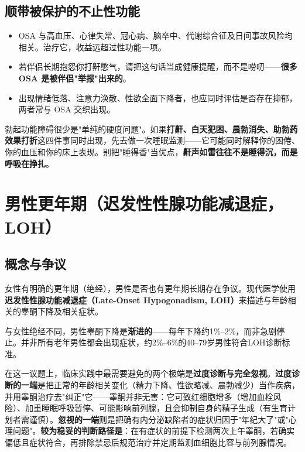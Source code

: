 \subsection{顺带被保护的不止性功能}

\begin{itemize}
	\item OSA 与高血压、心律失常、冠心病、脑卒中、代谢综合征及日间事故风险均相关。治疗它，收益远超过性功能一项。
	\item 若伴侣长期抱怨你打鼾憋气，请把这句话当成健康提醒，而不是唠叨——\textbf{很多 OSA 是被伴侣"举报"出来的}。
	\item 出现情绪低落、注意力涣散、性欲全面下降者，也应同时评估是否存在抑郁，两者常与 OSA 交织出现。
\end{itemize}

\begin{tcolorbox}[colback=pink!5!white,colframe=red!50!black,title=贴心小叮咛]
勃起功能障碍很少是"单纯的硬度问题"。如果\textbf{打鼾、白天犯困、晨勃消失、助勃药效果打折}这四件事同时出现，先去做一次睡眠监测——它可能同时解释你的困倦、你的血压和你的床上表现。别把"睡得香"当优点，\textbf{鼾声如雷往往不是睡得沉，而是呼吸在挣扎}。
\end{tcolorbox}

\section{男性更年期（迟发性性腺功能减退症，LOH）}
\label{sec:male_menopause}

\subsection{概念与争议}

女性有明确的更年期（绝经），男性是否也有更年期长期存在争议。现代医学使用\textbf{迟发性性腺功能减退症（Late-Onset Hypogonadism, LOH）}来描述与年龄相关的睾酮下降及相关症状。

与女性绝经不同，男性睾酮下降是\textbf{渐进的}——每年下降约1\%--2\%，而非急剧停止。并非所有老年男性都会出现症状，约2\%--6\%的40--79岁男性符合LOH诊断标准。


在这一议题上，临床实践中最需要避免的两个极端是\textbf{过度诊断与完全忽视}。\textbf{过度诊断的一端}是把正常的年龄相关变化（精力下降、性欲略减、晨勃减少）当作疾病，并用睾酮治疗去"纠正"它——睾酮并非无害：它可致红细胞增多（增加血栓风险）、加重睡眠呼吸暂停、可能影响前列腺，且会抑制自身的精子生成（有生育计划者需谨慎）。\textbf{忽视的一端}则是把确有内分泌缺陷者的症状归因于"年纪大了"或"心理问题"。\textbf{较为稳妥的判断路径是}：在有症状的前提下检测两次上午睾酮，若确实偏低且症状符合，再排除禁忌后规范治疗并定期监测血细胞比容与前列腺情况。

